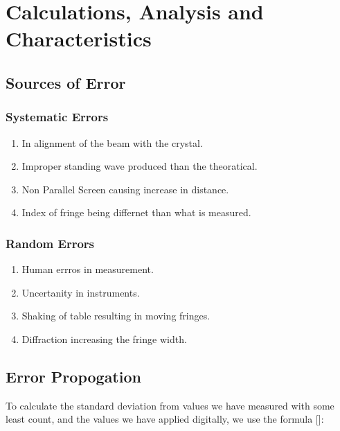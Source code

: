 \documentclass[%
sor,
 jor,
 amsmath,amssymb,
 reprint,
longbibliography,
]{revtex4-2}
\begin{document}
\section{Calculations, Analysis and Characteristics}
\subsection{Sources of Error}

\noindent %
\begin{minipage}[t]{0.48\textwidth}
\subsubsection{Systematic Errors}
\begin{enumerate}
	\item In alignment of the beam with the crystal.
	\item Improper standing wave produced than the theoratical.
	\item Non Parallel Screen causing increase in distance.
	\item Index of fringe being differnet than what is measured. 
\end{enumerate}
\end{minipage}
\hfill %
\begin{minipage}[t]{0.48\textwidth}
\subsubsection{Random Errors}
\begin{enumerate}
	\item Human errros in measurement.
	\item Uncertanity in instruments.
	\item Shaking of table resulting in moving fringes.
	\item Diffraction increasing the fringe width.
\end{enumerate}
\end{minipage}

\subsection{Error Propogation}
To calculate the standard deviation from values we have measured with some least count, and the values we have applied digitally, we use the formula [\cite{tewari_uncertainty}]: 
\end{document}
